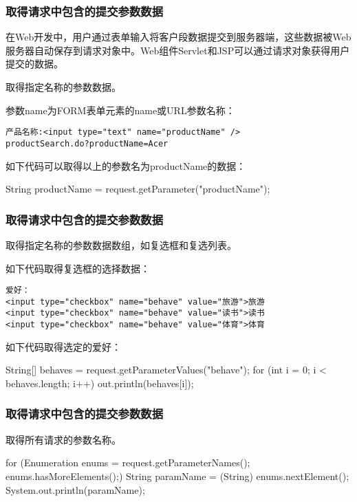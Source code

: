 \begin{frame} %
\frametitle{取得请求中包含的提交参数数据} 

在Web开发中，用户通过表单输入将客户段数据提交到服务器端，这些数据被Web服务器自动保存到请求对象中。Web组件Servlet和JSP可以通过请求对象获得用户提交的数据。

 取得指定名称的参数数据。

参数name为FORM表单元素的name或URL参数名称：
\begin{verbatim}
产品名称:<input type="text" name="productName" />
productSearch.do?productName=Acer
\end{verbatim}

如下代码可以取得以上的参数名为productName的数据：
\begin{javaCode}
String productName = request.getParameter("productName");
\end{javaCode}
\end{frame}

\begin{frame} %
\frametitle{取得请求中包含的提交参数数据} 

 取得指定名称的参数数据数组，如复选框和复选列表。

如下代码取得复选框的选择数据：
\begin{verbatim}
爱好：
<input type="checkbox" name="behave" value="旅游">旅游
<input type="checkbox" name="behave" value="读书">读书
<input type="checkbox" name="behave" value="体育">体育
\end{verbatim}

如下代码取得选定的爱好：

\begin{javaCode}
String[] behaves = request.getParameterValues("behave");
for (int i = 0; i < behaves.length; i++) {
  out.println(behaves[i]);
}
\end{javaCode}
\end{frame}

\begin{frame}[fragile] %
\frametitle{取得请求中包含的提交参数数据} 
 取得所有请求的参数名称。

\begin{javaCode}
for (Enumeration enums = request.getParameterNames(); enums.hasMoreElements();) {
  String paramName = (String) enums.nextElement();
  System.out.println(paramName);
}
\end{javaCode}
\end{frame}

